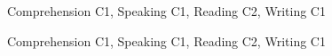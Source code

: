 

\begin{content}
	Comprehension C1, Speaking C1, Reading C2, Writing C1
\end{content}


\begin{content}
	Comprehension C1, Speaking C1, Reading C2, Writing C1
\end{content}